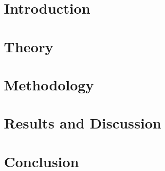 \documentclass[%
a4paper,							
11pt,								
bibliography=totoc,						
abstracton=true					
]
{scrartcl}
\theoremstyle{plain}
\theoremstyle{definition}
\theoremstyle{remark}
\newcommand{\1}{\mathbbm{1}}
\begin{document}


\section{Introduction}\label{sec:Introduction}



\section{Theory}\label{sec:theory}




\section{Methodology}\label{sec:Method}



\section{Results and Discussion}\label{sec:Results}



\section{Conclusion}\label{sec:Conclusion}


\newpage
\appendix
\end{document}
